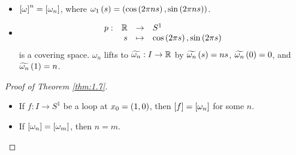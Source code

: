 \begin{remark1}
\hfill
\begin{itemize}
\item $ \sb{\omega}^n = \sb{\omega_n} $, where $ \omega_1\rb{s} = \rb{\cos\rb{2\pi ns}, \sin\rb{2\pi ns}} $.
\item
$$ \function[p]{\R}{S^1}{s}{{\cos\rb{2\pi s}, \sin\rb{2\pi s}}} $$
is a covering space. $ \omega_n $ lifts to $ \widetilde{\omega_n} : I \to \R $ by $ \widetilde{\omega_n}\rb{s} = ns $, $ \widetilde{\omega_n}\rb{0} = 0 $, and $ \widetilde{\omega_n}\rb{1} = n $.
\end{itemize}
\end{remark1}

\begin{proof}[Proof of Theorem \ref{thm:1.7}]
\hfill
\begin{itemize}
\item If $ f : I \to S^1 $ be a loop at $ x_0 = \rb{1, 0} $, then $ \sb{f} = \sb{\omega_n} $ for some $ n $.
\item If $ \sb{\omega_n} = \sb{\omega_m} $, then $ n = m $.
\end{itemize}
\end{proof}

